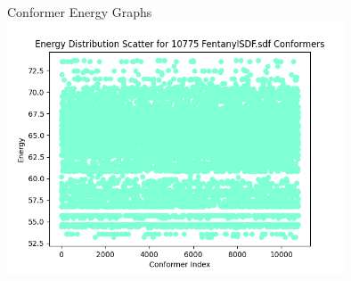 \documentclass[aspectratio=169]{beamer}
\begin{document}
\begin{frame}{Conformer Energy Graphs}
\includegraphics[width=10cm]{img/Graphs/FentanylSDF_Energy_Scatter.png}
\end{frame}
\end{document}
